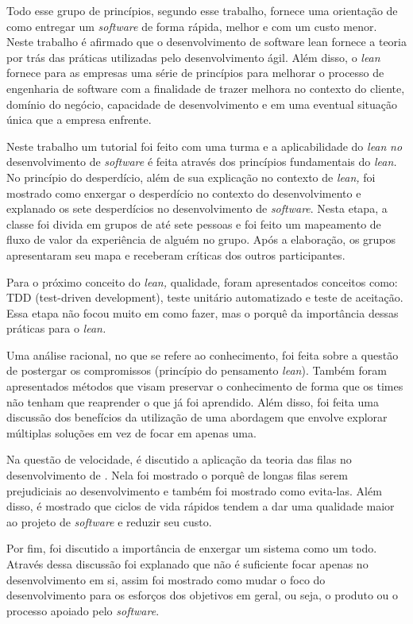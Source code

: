 Todo esse grupo de princípios, segundo esse trabalho, fornece uma orientação de como entregar um \textit{software} de forma rápida, melhor e com um custo menor. Neste trabalho é afirmado que o desenvolvimento de software lean fornece a teoria por trás das práticas utilizadas pelo desenvolvimento ágil. Além disso, o \textit{lean} fornece para as empresas uma série de princípios para melhorar o processo de engenharia de software com a finalidade de trazer melhora no contexto do cliente, domínio do negócio, capacidade de desenvolvimento e em uma eventual situação única que a empresa enfrente.

Neste trabalho um tutorial foi feito com uma turma e a aplicabilidade do \textit{lean}\textit{ no} desenvolvimento de \textit{software} é feita através dos princípios fundamentais do \textit{lean}\textit{.} No princípio do desperdício, além de sua explicação no contexto de \textit{lean}\textit{,} foi mostrado como enxergar o desperdício no contexto do desenvolvimento e explanado os sete desperdícios no desenvolvimento de \textit{software}. Nesta etapa, a classe foi divida em grupos de até sete pessoas e foi feito um mapeamento de fluxo de valor da experiência de alguém no grupo. Após a elaboração, os grupos apresentaram seu mapa e receberam críticas dos outros participantes.

Para o próximo conceito do \textit{lean}\textit{,} qualidade, foram apresentados conceitos como: TDD (test-driven development), teste unitário automatizado e teste de aceitação. Essa etapa não focou muito em como fazer, mas o porquê da importância dessas práticas para o \textit{lean}\textit{.}

Uma análise racional, no que se refere ao conhecimento, foi feita sobre a questão de postergar os compromissos (princípio do pensamento \textit{lean}). Também foram apresentados métodos que visam preservar o conhecimento de forma que os times não tenham que reaprender o que já foi aprendido. Além disso, foi feita uma discussão dos benefícios da utilização de uma abordagem que envolve explorar múltiplas soluções em vez de focar em apenas uma.

Na questão de velocidade, é discutido a aplicação da teoria das filas no desenvolvimento de \textit{\textit{}.} Nela foi mostrado o porquê de longas filas serem prejudiciais ao desenvolvimento e também foi mostrado como evita-las. Além disso, é mostrado que ciclos de vida rápidos tendem a dar uma qualidade maior ao projeto de \textit{software} e reduzir seu custo.

Por fim, foi discutido a importância de enxergar um sistema como um todo. Através dessa discussão foi explanado que não é suficiente focar apenas no desenvolvimento em si, assim foi mostrado como mudar o foco do desenvolvimento para os esforços dos  objetivos em geral, ou seja, o produto ou o processo apoiado pelo \textit{software}.

